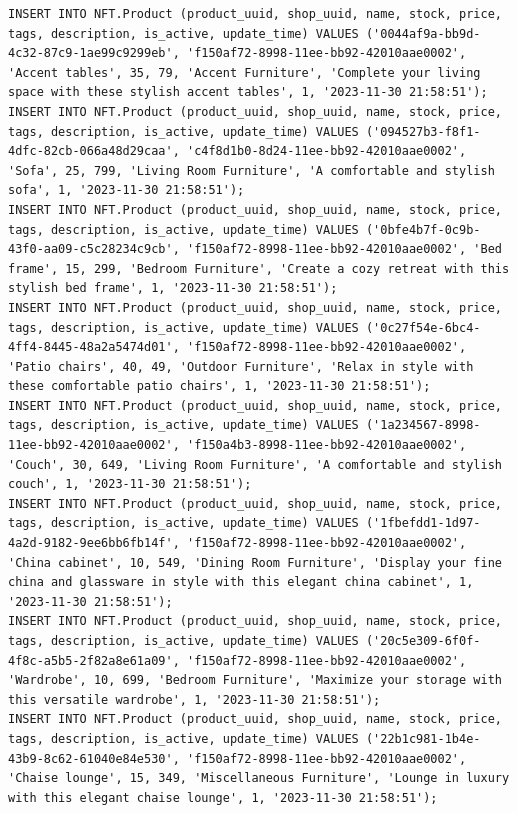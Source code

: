 \documentclass[a4paper, 12pt]{article}
\begin{document}
\begin{lstlisting}
INSERT INTO NFT.Product (product_uuid, shop_uuid, name, stock, price, tags, description, is_active, update_time) VALUES ('0044af9a-bb9d-4c32-87c9-1ae99c9299eb', 'f150af72-8998-11ee-bb92-42010aae0002', 'Accent tables', 35, 79, 'Accent Furniture', 'Complete your living space with these stylish accent tables', 1, '2023-11-30 21:58:51');
INSERT INTO NFT.Product (product_uuid, shop_uuid, name, stock, price, tags, description, is_active, update_time) VALUES ('094527b3-f8f1-4dfc-82cb-066a48d29caa', 'c4f8d1b0-8d24-11ee-bb92-42010aae0002', 'Sofa', 25, 799, 'Living Room Furniture', 'A comfortable and stylish sofa', 1, '2023-11-30 21:58:51');
INSERT INTO NFT.Product (product_uuid, shop_uuid, name, stock, price, tags, description, is_active, update_time) VALUES ('0bfe4b7f-0c9b-43f0-aa09-c5c28234c9cb', 'f150af72-8998-11ee-bb92-42010aae0002', 'Bed frame', 15, 299, 'Bedroom Furniture', 'Create a cozy retreat with this stylish bed frame', 1, '2023-11-30 21:58:51');
INSERT INTO NFT.Product (product_uuid, shop_uuid, name, stock, price, tags, description, is_active, update_time) VALUES ('0c27f54e-6bc4-4ff4-8445-48a2a5474d01', 'f150af72-8998-11ee-bb92-42010aae0002', 'Patio chairs', 40, 49, 'Outdoor Furniture', 'Relax in style with these comfortable patio chairs', 1, '2023-11-30 21:58:51');
INSERT INTO NFT.Product (product_uuid, shop_uuid, name, stock, price, tags, description, is_active, update_time) VALUES ('1a234567-8998-11ee-bb92-42010aae0002', 'f150a4b3-8998-11ee-bb92-42010aae0002', 'Couch', 30, 649, 'Living Room Furniture', 'A comfortable and stylish couch', 1, '2023-11-30 21:58:51');
INSERT INTO NFT.Product (product_uuid, shop_uuid, name, stock, price, tags, description, is_active, update_time) VALUES ('1fbefdd1-1d97-4a2d-9182-9ee6bb6fb14f', 'f150af72-8998-11ee-bb92-42010aae0002', 'China cabinet', 10, 549, 'Dining Room Furniture', 'Display your fine china and glassware in style with this elegant china cabinet', 1, '2023-11-30 21:58:51');
INSERT INTO NFT.Product (product_uuid, shop_uuid, name, stock, price, tags, description, is_active, update_time) VALUES ('20c5e309-6f0f-4f8c-a5b5-2f82a8e61a09', 'f150af72-8998-11ee-bb92-42010aae0002', 'Wardrobe', 10, 699, 'Bedroom Furniture', 'Maximize your storage with this versatile wardrobe', 1, '2023-11-30 21:58:51');
INSERT INTO NFT.Product (product_uuid, shop_uuid, name, stock, price, tags, description, is_active, update_time) VALUES ('22b1c981-1b4e-43b9-8c62-61040e84e530', 'f150af72-8998-11ee-bb92-42010aae0002', 'Chaise lounge', 15, 349, 'Miscellaneous Furniture', 'Lounge in luxury with this elegant chaise lounge', 1, '2023-11-30 21:58:51');

\end{lstlisting}
\end{document}
